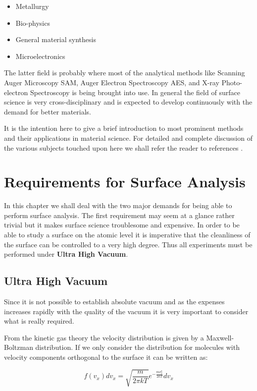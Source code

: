 \begin{itemize}
\item Metallurgy
\item Bio-physics
\item General material synthesis
\item Microelectronics
\end{itemize}

The latter field is probably where most of the analytical methods like Scanning Auger Microscopy SAM, Auger Electron Spectroscopy AES, and X-ray Photo-electron Spectroscopy is being brought into use. In general the field of surface science is very cross-disciplinary and is expected to develop continuously with the demand for better materials.

It is the intention here to give a brief introduction to most prominent methods and their applications in material science. For detailed and complete discussion of the various subjects touched upon here we shall refer the reader to references \cite{Zangwill, Somorjai,Hudson,Niemantsverdriet, Ertl,briggs,feldman,woodruff}.

\chapter{Requirements for Surface Analysis}
In this chapter we shall deal with the two major demands for being able to perform surface analysis. The first requirement may seem at a glance rather trivial but it makes surface science troublesome and expensive. In order to be able to study a surface on the atomic level it is imperative that the cleanliness of the surface can be controlled to a very high degree. Thus all experiments must be performed under \textbf{Ultra High Vacuum}.

\section{Ultra High Vacuum}
Since it is not possible to establish absolute vacuum and as the expenses increases rapidly with the quality of the vacuum it is very important to consider what is really required.

From the kinetic gas theory the velocity distribution is given by a Maxwell-Boltzman distribution. If we only consider the distribution for molecules with velocity components orthogonal to the surface it can be written as:

\begin{equation}
f(v_x)dv_x = \sqrt{\frac{m}{2\pi kT}}e^{-\frac{mv_x^2}{2kT}}dv_x
\end{equation}

